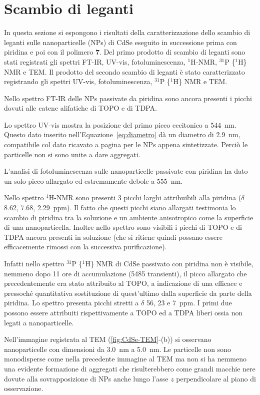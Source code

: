 \section{Scambio di leganti}

In questa sezione si espongono i risultati della caratterizzazione dello scambio di leganti sulle nanoparticelle (NPs) di CdSe eseguito in successione prima con piridina e poi con il polimero {\bf 7}. 
Del primo prodotto di scambio di leganti sono stati registrati gli spettri FT-IR, UV-vis, fotoluminescenza, $^1$H-NMR, $^{31}$P \{$^1$H\} NMR e TEM\@.  Il prodotto del secondo scambio di leganti è stato caratterizzato registrando gli spettri 
UV-vis, fotoluminescenza, {
  $^{31}$P \{$^1$H\} NMR e TEM.}

Nello spettro FT-IR delle NPs passivate da piridina {
 sono ancora presenti i picchi dovuti alle catene alifatiche di TOPO e di TDPA}.

Lo spettro UV-vis mostra la posizione del primo picco eccitonico a 544~nm.
Questo dato inserito nell'Equazione~\ref{eq:diametro} dà un diametro di 2.9~nm, compatibile col dato ricavato a pagina \pageref{eq:diametro} per le NPs appena sintetizzate. Perciò le particelle non si sono unite a dare aggregati. 

L'analisi di fotoluminescenza sulle nanoparticelle passivate con piridina ha dato un solo picco allargato ed estremamente debole a 555~nm.

Nello spettro $^1$H-NMR 
sono presenti 3 picchi larghi attribuibili alla piridina ($\delta$ 8.62, 7.68, 2.29~ppm). Il fatto che questi picchi siano allargati testimonia lo scambio di piridina tra la soluzione e un ambiente anisotropico come la superficie di una nanoparticella. Inoltre nello spettro sono visibili i picchi di TOPO e di TDPA ancora presenti in soluzione (che si ritiene quindi possano essere efficacemente rimossi con la successiva purificazione).

Infatti nello spettro $^{31}$P \{$^1$H\} NMR di CdSe passivato con piridina non è visibile, nemmeno dopo 11 ore di accumulazione (5485 transienti),  {
il picco allargato che precedentemente era stato attribuito al TOPO, a indicazione di una efficace e pressoché quantitativa sostituzione di quest'ultimo dalla superficie da parte della piridina.} Lo spettro presenta picchi stretti a $\delta$ 56, 23 e 7~ppm. I primi due possono essere attribuiti \cite{lig-CdSe-P} rispettivamente a TOPO ed a TDPA liberi ossia non legati a nanoparticelle.

{
 Nell'immagine registrata al TEM (\ref{fig:CdSe-TEM}-(b)) si osservano nanoparticelle con dimensioni da 3.0~nm a 5.0~nm. Le particelle non sono monodisperse come nella precedente immagine al TEM ma non si ha nemmeno una evidente formazione di aggregati che risulterebbero come grandi macchie nere dovute alla sovrapposizione di NPs anche lungo l'asse $z$ perpendicolare al piano di osservazione. }

